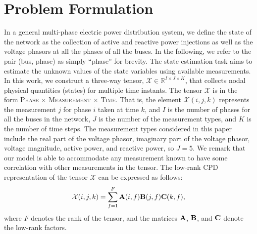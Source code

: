 \documentclass[journal]{IEEEtran}
\newcounter{define}
\newcommand{\A}{{\bf A}}
\newcommand{\B}{{\bf B}}
\newcommand{\C}{{\bf C}}
\newcommand{\Ten}[1]{\mathcal{#1}}
\newcommand{\revision}[1]{{\color{black} #1}} %
\begin{document}
\section{Problem Formulation}
\label{sec:distributedprobform}
In \revision{a general multi-phase} electric power distribution system, we define the state of the network as the collection of active and reactive power injections as well as the voltage phasors at \revision{all the phases of all the buses. In the following, we refer to the pair (bus, phase) as simply ``phase'' for brevity.} The state estimation task aims to estimate the unknown values of the state variables using available measurements.
In this work, we construct a three-way tensor, $\Ten{X}\in\mathbb{R}^{I\times J\times K}$, that collects nodal physical quantities (states) for multiple time instants. The tensor $\Ten{X}$ is in the form \textsc{Phase} $\times$ \textsc{Measurement} $\times$ \textsc{Time}. That is, the element $\Ten{X}(i,j,k)$ represents the measurement $j$ for phase $i$ taken at time $k$, \revision{and $I$ is the number of phases for all the buses in the network, $J$ is the number of the measurement types, and $K$ is the number of time steps}. \revision{The measurement types considered in this paper include the real part of the voltage phasor, imaginary part of the voltage phasor, voltage magnitude, active power, and reactive power, so $J=5$.  We  remark  that  our  model  is  able  to  accommodate any measurement known to have some correlation with other measurements in the tensor.}
 The low-rank CPD representation of the tensor $\Ten{X}$ can be expressed as follows:
\begin{align}
\Ten{X}(i, j, k) = \sum_{f=1}^{F} \A(i, f) \B(j, f) \C(k, f),
\end{align}
where $F$ denotes the rank of the tensor, and the matrices $\A$, $\B$, and $\C$ denote the low-rank factors.  %
\end{document}
